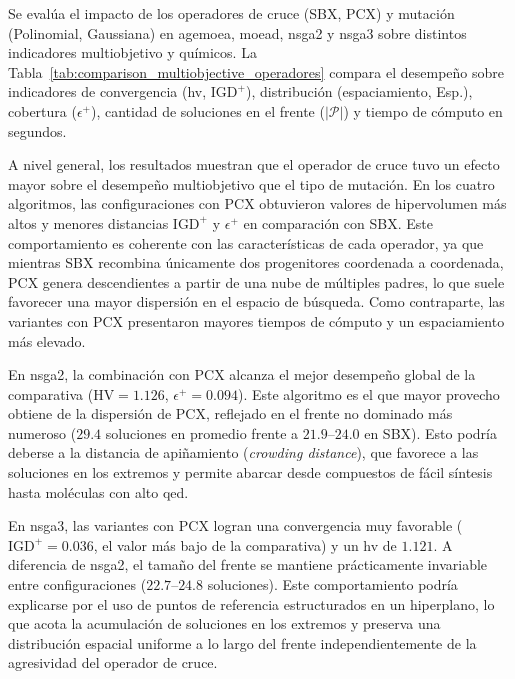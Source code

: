 Se evalúa el impacto de los operadores de cruce (SBX, PCX) y mutación (Polinomial, Gaussiana) en \acrshort{agemoea}, \acrshort{moead}, \acrshort{nsga2} y \acrshort{nsga3} sobre distintos indicadores multiobjetivo y químicos. La Tabla~\ref{tab:comparison_multiobjective_operadores} compara el desempeño sobre indicadores de convergencia (\acrshort{hv}, $\text{IGD}^+$), distribución (espaciamiento, Esp.), cobertura ($\epsilon^+$), cantidad de soluciones en el frente ($|\mathcal{P}|$) y tiempo de cómputo en segundos.



A nivel general, los resultados muestran que el operador de cruce tuvo un efecto mayor sobre el desempeño multiobjetivo que el tipo de mutación. En los cuatro algoritmos, las configuraciones con PCX obtuvieron valores de hipervolumen más altos y menores distancias $\text{IGD}^+$ y $\epsilon^+$ en comparación con SBX. Este comportamiento es coherente con las características de cada operador, ya que mientras SBX recombina únicamente dos progenitores coordenada a coordenada, PCX genera descendientes a partir de una nube de múltiples padres, lo que suele favorecer una mayor dispersión en el espacio de búsqueda. Como contraparte, las variantes con PCX presentaron mayores tiempos de cómputo y un espaciamiento más elevado.

En \acrshort{nsga2}, la combinación con PCX alcanza el mejor desempeño global de la comparativa ($\text{HV} = 1.126$, $\epsilon^+ = 0.094$). Este algoritmo es el que mayor provecho obtiene de la dispersión de PCX, reflejado en el frente no dominado más numeroso ($29.4$ soluciones en promedio frente a $21.9\text{--}24.0$ en SBX). Esto podría deberse a la distancia de apiñamiento (\textit{crowding distance}), que favorece a las soluciones en los extremos y permite abarcar desde compuestos de fácil síntesis hasta moléculas con alto \gls{qed}.

En \acrshort{nsga3}, las variantes con PCX logran una convergencia muy favorable ($\text{IGD}^+ = 0.036$, el valor más bajo de la comparativa) y un \acrshort{hv} de $1.121$. A diferencia de \acrshort{nsga2}, el tamaño del frente se mantiene prácticamente invariable entre configuraciones ($22.7\text{--}24.8$ soluciones). Este comportamiento podría explicarse por el uso de puntos de referencia estructurados en un hiperplano, lo que acota la acumulación de soluciones en los extremos y preserva una distribución espacial uniforme a lo largo del frente independientemente de la agresividad del operador de cruce.

